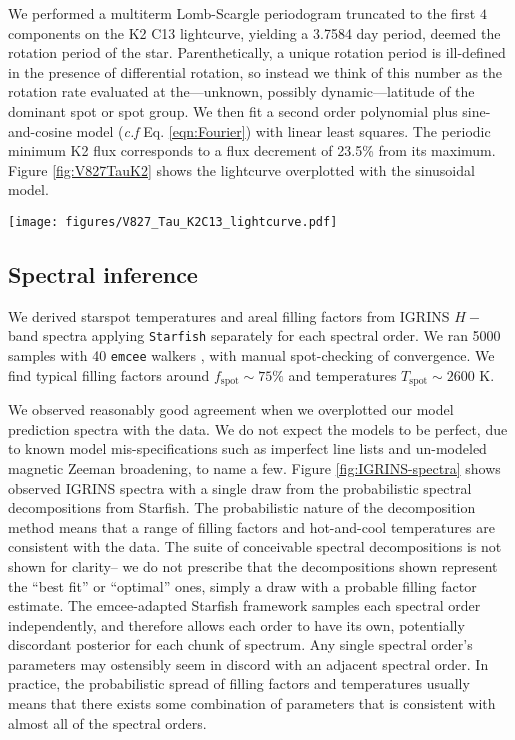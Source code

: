 \documentclass[revtex4]{emulateapj}%
\begin{document}
We performed a multiterm Lomb-Scargle periodogram \citep{ivezic14} truncated to the first $4$ components \citep{vanderplas15a} on the K2 C13 lightcurve, yielding a 3.7584 day period, deemed the rotation period of the star.  Parenthetically, a unique rotation period is ill-defined in the presence of differential rotation, so instead we think of this number as the rotation rate evaluated at the---unknown, possibly dynamic---latitude of the dominant spot or spot group.  We then fit a second order polynomial plus sine-and-cosine model (\emph{c.f} Eq. \ref{eqn:Fourier}) with linear least squares.  The periodic minimum K2 flux corresponds to a flux decrement of 23.5\% from its maximum.  Figure \ref{fig:V827TauK2} shows the lightcurve overplotted with the sinusoidal model.

\begin{figure*}
 \centering
 \texttt{[image: figures/V827\_Tau\_K2C13\_lightcurve.pdf]}
 \caption{K2 C13 lightcurve of V827 Tau with a polynomial and sinusoidal model overplotted.  A few flares are perceptible.}
 \label{fig:V827TauK2}
\end{figure*}

\subsection{Spectral inference}
We derived starspot temperatures and areal filling factors from IGRINS $H-$band spectra applying \texttt{Starfish} separately for each spectral order.  We ran 5000 samples with 40 \texttt{emcee} walkers \citep{foreman13}, with manual spot-checking of convergence.  We find typical filling factors around $f_\mathrm{spot} \sim 75\%$ and temperatures $T_\mathrm{spot} \sim 2600$ K.

We observed reasonably good agreement when we overplotted our model prediction spectra with the data.  We do not expect the models to be perfect, due to known model mis-specifications such as imperfect line lists and un-modeled magnetic Zeeman broadening, to name a few.  Figure \ref{fig:IGRINS-spectra} shows observed IGRINS spectra with a single draw from the probabilistic spectral decompositions from Starfish.  The probabilistic nature of the decomposition method means that a range of filling factors and hot-and-cool temperatures are consistent with the data.  The suite of conceivable spectral decompositions is not shown for clarity-- we do not prescribe that the decompositions shown represent the ``best fit'' or ``optimal'' ones, simply a draw with a probable filling factor estimate.  The emcee-adapted Starfish framework samples each spectral order independently, and therefore allows each order to have its own, potentially discordant posterior for each chunk of spectrum.  Any single spectral order's parameters may ostensibly seem in discord with an adjacent spectral order.  In practice, the probabilistic spread of filling factors and temperatures usually means that there exists some combination of parameters that is consistent with almost all of the spectral orders.
\end{document}
